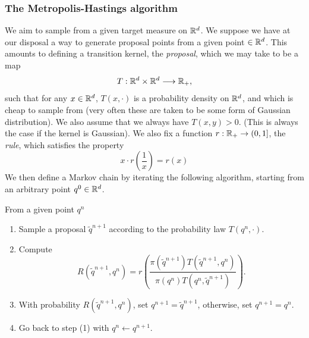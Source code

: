     \subsubsection*{The Metropolis-Hastings algorithm}
     We aim to sample from a given target measure on $\mathbb{R}^d$. We suppose we have at our disposal a way to generate proposal points from a given point $\in\mathbb{R}^d$. This amounts to defining a transition kernel, the \textit{proposal}, which we may take to be a map
     \[T:\mathbb{R}^d\times\mathbb{R}^d\longrightarrow\mathbb{R}_+,\]
     such that for any $x\in\mathbb{R}^d$, $T(x,\cdot)$ is a probability density on $\mathbb{R}^d$, and which is cheap to sample from (very often these are taken to be some form of Gaussian distribution). We also assume that we always have $T(x,y)>0$. (This is always the case if the kernel is Gaussian).
     We also fix a function $r:\mathbb{R}_+\to(0,1]$, the \textit{rule}, which satisfies the property
     \begin{equation}\label{eq:mh_rule}x\cdot r\left(\frac1x\right)=r(x)\end{equation}
     We then define a Markov chain by iterating the following algorithm, starting from an arbitrary point $q^0\in \mathbb{R}^d$.

     \begin{algorithm}
        From a given point $q^n$
        \begin{enumerate}[(1)]
            \item Sample a proposal $\tilde q^{n+1}$ according to the probability law $T(q^n,\cdot)$.
            \item Compute\[R(\tilde q^{n+1},q^n)=r\left(\frac{\pi(\tilde q^{n+1})T(\tilde q^{n+1},q^n)}{\pi(q^n)T(q^n,\tilde q^{n+1})}\right).\]
            \item With probability $R(\tilde q^{n+1},q^n)$, set $q^{n+1}=\tilde q^{n+1}$, otherwise, set $q^{n+1}=q^n$.
            \item Go back to step (1) with $q^n\leftarrow q^{n+1}$.
        \end{enumerate}
     \end{algorithm}

